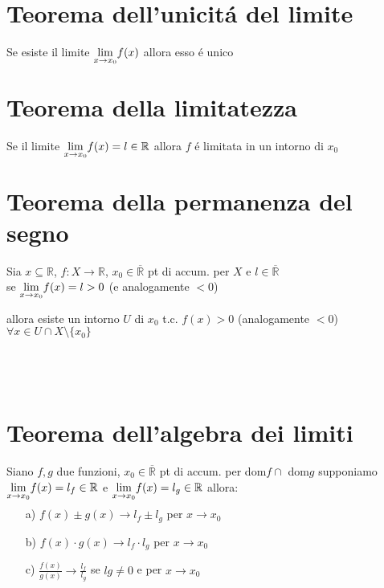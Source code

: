\section{Teorema dell'unicit\'a del limite}
Se esiste il limite $\smash{\displaystyle\lim_{x \to x_0}} f(x)$ allora esso \'e unico
\section{Teorema della limitatezza}
Se il limite $\smash{\displaystyle\lim_{x \to x_0}} f(x)=l \in \mathbb{R}$ allora $f$ \'e limitata in un intorno di $x_0$
\section{Teorema della permanenza del segno}
Sia $x \subseteq \mathbb{R}$, $f:X \rightarrow \mathbb{R}$, $x_0 \in \overline{\mathbb{R}}$ pt di accum. per $X$ e $l \in \overline{\mathbb{R}}$ \\
se $\smash{\displaystyle\lim_{x \to x_0}} f(x)=l >0$ (e analogamente $<0$) \\
\\
allora esiste un intorno $U$ di $x_0$ t.c. $f(x)>0$ (analogamente $<0$) $\forall x \in U \cap X \setminus \{x_0\}$ \\
\\
\\
\\
\section{Teorema dell'algebra dei limiti}
Siano $f, g$ due funzioni, $x_0 \in \overline{\mathbb{R}}$ pt di accum. per dom$f \cap$ dom$g$
supponiamo $\smash{\displaystyle\lim_{x \to x_0}} f(x)=l_f \in \mathbb{R}$ e $\smash{\displaystyle\lim_{x \to x_0}} f(x)=l_g \in \mathbb{R}$ allora:
\begin{itemize}
\item[a)]$f(x)\pm g(x) \rightarrow l_f \pm l_g$ per $x \to x_0$
\item[b)]$f(x)\cdot g(x) \rightarrow l_f \cdot l_g$ per $x \to x_0$
\item[c)]$\frac{f(x)}{g(x)} \rightarrow \frac{l_f}{l_g}$ se  $lg \not=0$ e per $x \to x_0$
\end{itemize}
